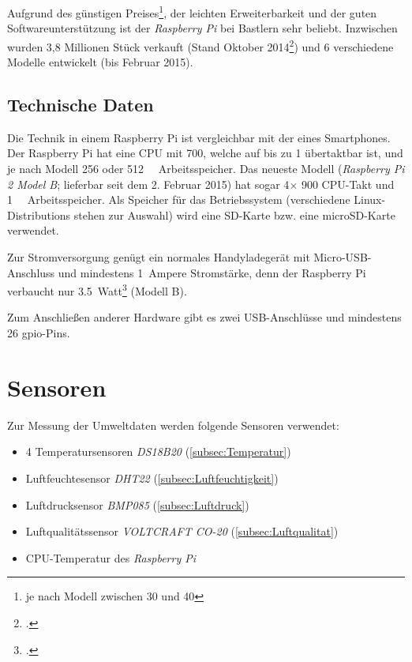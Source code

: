 Aufgrund des günstigen Preises\footnote{je nach Modell zwischen 30 und \SI{40}{\text{\texteuro}}}, der leichten Erweiterbarkeit und der guten Softwareunterstützung ist der \emph{Raspberry Pi} bei Bastlern sehr beliebt. Inzwischen wurden 3,8 Millionen Stück verkauft (Stand Oktober 2014\footcite{verkauf}) und 6 verschiedene Modelle entwickelt (bis Februar 2015).

\subsection{Technische Daten}
\label{subsec:Technische Daten}
Die Technik in einem Raspberry Pi ist vergleichbar mit der eines Smartphones. Der Raspberry Pi hat eine \gls{CPU} mit \SI{700}{}, welche auf bis zu \SI{1}{} übertaktbar ist, und je nach Modell \SI{256}{} oder \SI{512}{\mega\byte} Arbeitsspeicher. Das neueste Modell (\emph{Raspberry Pi 2 Model B}; lieferbar seit dem 2. Februar 2015) hat sogar 4\ensuremath{\times} \SI{900}{} \gls{CPU}-Takt und \SI{1}{\giga\byte} Arbeitsspeicher. Als Speicher für das Betriebssystem (verschiedene \glspl{Linux-Distribution} stehen zur Auswahl) wird eine SD-Karte bzw. eine microSD-Karte verwendet.

Zur Stromversorgung genügt ein normales Handyladegerät mit Micro-USB-Anschluss und mindestens \SI{1}{\gls{Ampere}} Stromstärke, denn der Raspberry Pi verbaucht nur \SI{3.5}{Watt}\footcite{strom} (Modell B).

Zum Anschließen anderer Hardware gibt es zwei USB-Anschlüsse und mindestens 26 \gls{gpio}-Pins.

\section{Sensoren}
\label{sec:Sensoren}

Zur Messung der Umweltdaten werden folgende Sensoren verwendet:
\begin{itemize}
\item 4 Temperatursensoren \emph{DS18B20} (\ref{subsec:Temperatur})
\item Luftfeuchtesensor \emph{DHT22} (\ref{subsec:Luftfeuchtigkeit})
\item Luftdrucksensor \emph{BMP085} (\ref{subsec:Luftdruck})
\item Luftqualitätssensor \emph{VOLTCRAFT CO-20} (\ref{subsec:Luftqualitat})
\item\gls{CPU}-Temperatur des \emph{Raspberry Pi}
\end{itemize}
